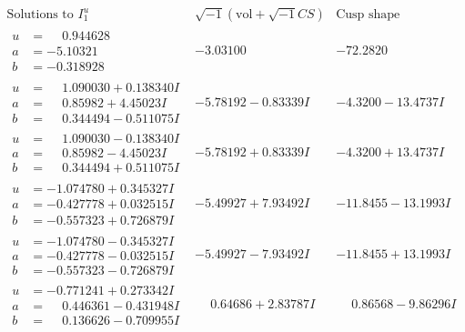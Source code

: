 \documentclass[1p]{elsarticle_modified}
\theoremstyle{definition}
\newcommand{\I}{\sqrt{-1}}
\begin{document}
$$\begin{array}{c|c|c}  
\text{Solutions to }I^u_{1}& \I (\text{vol} + \sqrt{-1}CS) & \text{Cusp shape}\\
 \hline 
\begin{aligned}
u &= \phantom{-}0.944628\phantom{ +0.000000I} \\
a &= -5.10321\phantom{ +0.000000I} \\
b &= -0.318928\phantom{ +0.000000I}\end{aligned}
 & -3.03100\phantom{ +0.000000I} & -72.2820\phantom{ +0.000000I} \\ \hline\begin{aligned}
u &= \phantom{-}1.090030 + 0.138340 I \\
a &= \phantom{-}0.85982 + 4.45023 I \\
b &= \phantom{-}0.344494 - 0.511075 I\end{aligned}
 & -5.78192 - 0.83339 I & -4.3200 - 13.4737 I \\ \hline\begin{aligned}
u &= \phantom{-}1.090030 - 0.138340 I \\
a &= \phantom{-}0.85982 - 4.45023 I \\
b &= \phantom{-}0.344494 + 0.511075 I\end{aligned}
 & -5.78192 + 0.83339 I & -4.3200 + 13.4737 I \\ \hline\begin{aligned}
u &= -1.074780 + 0.345327 I \\
a &= -0.427778 + 0.032515 I \\
b &= -0.557323 + 0.726879 I\end{aligned}
 & -5.49927 + 7.93492 I & -11.8455 - 13.1993 I \\ \hline\begin{aligned}
u &= -1.074780 - 0.345327 I \\
a &= -0.427778 - 0.032515 I \\
b &= -0.557323 - 0.726879 I\end{aligned}
 & -5.49927 - 7.93492 I & -11.8455 + 13.1993 I \\ \hline\begin{aligned}
u &= -0.771241 + 0.273342 I \\
a &= \phantom{-}0.446361 - 0.431948 I \\
b &= \phantom{-}0.136626 - 0.709955 I\end{aligned}
 & \phantom{-}0.64686 + 2.83787 I & \phantom{-}0.86568 - 9.86296 I \\ \hline\begin{aligned}

\end{aligned}
\end{array}$$
\end{document}
